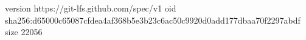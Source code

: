 version https://git-lfs.github.com/spec/v1
oid sha256:d65000c65087cfdea4af368b5e3b23c6ac50c9920d0add177dbaa70f2297abdf
size 22056
